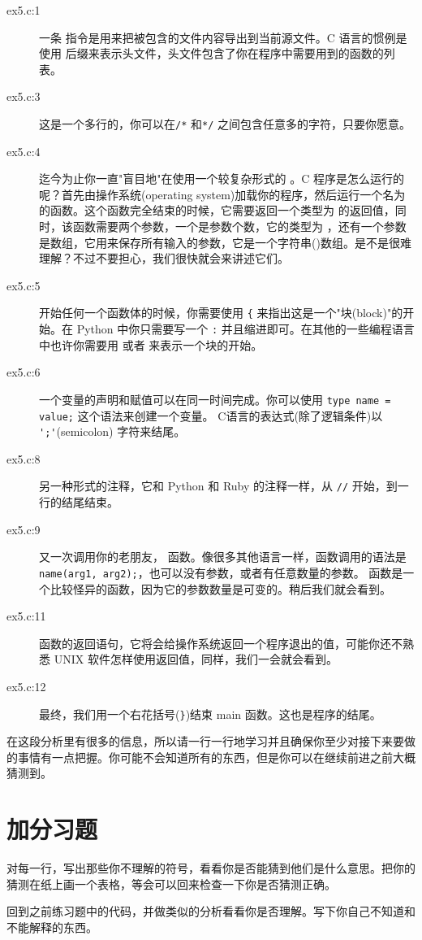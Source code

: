 \begin{description}
\item[ex5.c:1] 一条  指令是用来把被包含的文件内容导出到当前源文件。C 语言的惯例是使用  后缀来表示头文件，头文件包含了你在程序中需要用到的函数的列表。
\item[ex5.c:3] 这是一个多行的，你可以在\verb|/*| 和\verb|*/| 之间包含任意多的字符，只要你愿意。
\item[ex5.c:4] 迄今为止你一直"盲目地"在使用一个较复杂形式的 。C 程序是怎么运行的呢？首先由操作系统(operating system)加载你的程序，然后运行一个名为 的函数。这个函数完全结束的时候，它需要返回一个类型为  的返回值，同时，该函数需要两个参数，一个是参数个数，它的类型为 ，还有一个参数是数组，它用来保存所有输入的参数，它是一个字符串()数组。是不是很难理解？不过不要担心，我们很快就会来讲述它们。
\item[ex5.c:5] 开始任何一个函数体的时候，你需要使用 \verb|{| 来指出这是一个"块(block)"的开始。在 Python 中你只需要写一个 \verb|:| 并且缩进即可。在其他的一些编程语言中也许你需要用  或者  来表示一个块的开始。
\item[ex5.c:6] 一个变量的声明和赋值可以在同一时间完成。你可以使用 \verb|type name = value;| 这个语法来创建一个变量。
    C语言的表达式(除了逻辑条件)以 \verb|';'|(semicolon) 字符来结尾。
\item[ex5.c:8] 另一种形式的注释，它和 Python 和 Ruby 的注释一样，从 \verb|//| 开始，到一行的结尾结束。
\item[ex5.c:9] 又一次调用你的老朋友， 函数。像很多其他语言一样，函数调用的语法是 \verb|name(arg1, arg2);|，也可以没有参数，或者有任意数量的参数。 函数是一个比较怪异的函数，因为它的参数数量是可变的。稍后我们就会看到。
\item[ex5.c:11] 函数的返回语句，它将会给操作系统返回一个程序退出的值，可能你还不熟悉 UNIX 软件怎样使用返回值，同样，我们一会就会看到。
\item[ex5.c:12] 最终，我们用一个右花括号(\verb|}|)结束 main 函数。这也是程序的结尾。
\end{description}

在这段分析里有很多的信息，所以请一行一行地学习并且确保你至少对接下来要做的事情有一点把握。你可能不会知道所有的东西，但是你可以在继续前进之前大概猜测到。

\section{加分习题}

\begin{enumrate}
\item 对每一行，写出那些你不理解的符号，看看你是否能猜到他们是什么意思。把你的猜测在纸上画一个表格，等会可以回来检查一下你是否猜测正确。
\item 回到之前练习题中的代码，并做类似的分析看看你是否理解。写下你自己不知道和不能解释的东西。
\end{enumrate}
